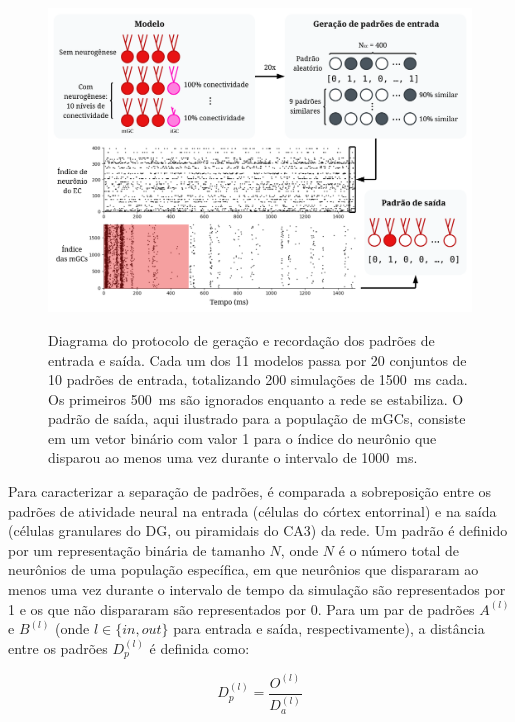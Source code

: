 \begin{figure}[H]
    \centering
    \caption{Diagrama do protocolo de geração e recordação dos padrões de entrada e saída. Cada um dos 11 modelos passa por 20
    conjuntos de 10 padrões de entrada, totalizando 200 simulações de \SI{1500}{\milli\second} cada. Os primeiros
    \SI{500}{\milli\second} são ignorados enquanto a rede se estabiliza. O padrão de saída, aqui ilustrado para a população de
    mGCs, consiste em um vetor binário com valor 1 para o índice do neurônio que disparou ao menos uma vez durante o intervalo de
    \SI{1000}{\milli\second}.}
    \includegraphics[width=\textwidth]{figuras/diagrama_entrada_saida}
    \label{fig:diagrama_entrada_saida}
\end{figure}

Para caracterizar a separação de padrões, é comparada a sobreposição entre os padrões de atividade neural na entrada (células do
córtex entorrinal) e na saída (células granulares do DG, ou piramidais do CA3) da rede. Um padrão é definido por um representação
binária de tamanho $N$, onde $N$ é o número total de neurônios de uma população específica, em que neurônios que dispararam ao
menos uma vez durante o intervalo de tempo da simulação são representados por 1 e os que não dispararam são representados por 0.
Para um par de padrões $A^{(l)}$ e $B^{(l)}$ (onde $l \in \{in, out\}$ para entrada e saída, respectivamente), a distância entre
os padrões $D_p^{(l)}$ é definida como:

\begin{equation}
    \label{eq:dp}
    D_p^{(l)} = \frac{O^{(l)}}{D_a^{(l)}}
\end{equation}

